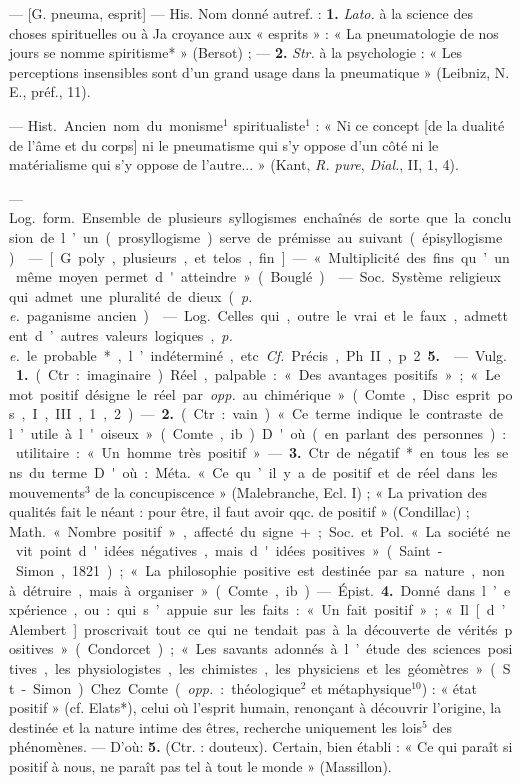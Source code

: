 \begin{itemize}[leftmargin=1cm, label=, itemsep=1pt]
 — [G.
pneuma, esprit] — His. Nom
donné autref. : {\bf 1.} {\it Lato.} à la science
des choses spirituelles ou à Ja
croyance aux « esprits » : « La pneumatologie
de nos jours se nomme
spiritisme* » (Bersot) ; — {\bf 2.} {\it Str.} à
la psychologie : « Les perceptions
insensibles sont d’un grand usage
dans la pneumatique » (Leibniz,
N. E., préf., 11).

 — \si{Hist.} Ancien nom
du monisme$^1$ spiritualiste$^1$ : « Ni ce
concept [de la dualité de l'âme et
du corps] ni le pneumatisme qui s’y
oppose d’un côté ni le matérialisme
qui s’y oppose de l’autre... » (Kant,
{\it R. pure}, {\it Dial.}, II, 1, 4).

 — \si{Log.} \si{form.} Ensemble de plusieurs syllogismes
enchaînés de sorte que la conclusion de l’un (prosyllogisme) serve
de prémisse au suivant (épisyllogisme).

 — [G. poly, plusieurs, et telos,
fin]. — « Multiplicité des fins qu’un
même moyen permet d'atteindre »
(Bouglé).

 — \si{Soc.} Système religieux qui admet une pluralité de
dieux ({\it p. e.} paganisme ancien).

 — \si{Log.} Celles
qui, outre le vrai et le faux, admettent d’autres valeurs logiques, {\it p. e.}
le probable*, l’indéterminé, etc. {\it Cf.}
Précis, Ph. II, p. 2 {\bf 5.}

 — \si{Vulg.} {\bf 1.} (Ctr. : imaginaire).
Réel, palpable : « Des avantages
positifs » ; « Le mot positif désigne le
réel par {\it opp.} au chimérique » (Comte,
Disc. esprit pos., I, III, 1, 2). —
 {\bf 2.} (Ctr. : vain). « Ce terme indique le
contraste de l’utile à l'oiseux »
(Comte, ib.). D'où (en parlant des
personnes) : utilitaire : « Un homme
très positif. » — {\bf 3.} Ctr. de négatif*
en tous les sens du terme. D'où :
\si{Méta.} « Ce qu’il y a de positif et de réel
dans les mouvements$^3$ de la concupiscence »
(Malebranche, Ecl. I) ; « La
privation des qualités fait le néant :
pour être, il faut avoir qqc. de
positif » (Condillac) ; \si{Math.} « Nombre
positif », affecté du signe +;
\si{Soc.} et \si{Pol.} « La société ne vit point
d'idées négatives, mais d'idées
positives » (Saint-Simon, 1821) ;
« La philosophie positive est destinée
par sa nature, non à détruire,
mais à organiser » (Comte, ib.).

— \si{Épist.} {\bf 4.} Donné dans l’expérience, ou : qui s’appuie sur les faits :
« Un fait positif » ; « Il [d’Alembert]
proscrivait tout ce qui ne tendait
pas à la découverte de vérités positives » (Condorcet) ; « Les savants
adonnés à l’étude des sciences positives, les physiologistes, les chimistes, les physiciens et les géomètres » (St-Simon). Chez Comte
({\it opp.} : théologique$^2$ et métaphysique$^{10}$) : « état positif » (cf. Elats*),
celui où l’esprit humain, renonçant
à découvrir l’origine, la destinée et
la nature intime des êtres, recherche
uniquement les lois$^5$ des phénomènes. — D'où: {\bf 5.} (Ctr. : douteux).
Certain, bien établi : « Ce qui paraît
si positif à nous, ne paraît pas tel à
tout le monde » (Massillon).


\end{itemize}
